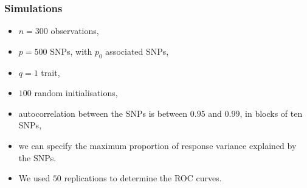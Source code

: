 \documentclass{beamer}
\newcommand*\mean[1]{\bar{#1}}
\begin{document}

\begin{frame}
\frametitle{Simulations}
\begin{itemize}
\item $n = 300$ observations,
\item $p = 500$ SNPs, with $p_0$ associated SNPs,
\item $q = 1$ trait, %
\item $100$ random initialisations,
\item autocorrelation between the SNPs is between $0.95$ and $0.99$, in blocks of ten SNPs,
\item we can specify the maximum proportion of response variance explained by the SNPs.
\item We used $50$ replications to determine the ROC curves.
\end{itemize}
\end{frame}

\end{document}
